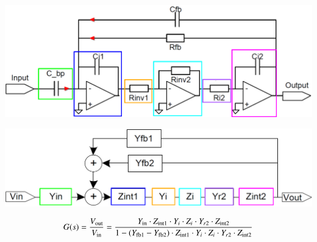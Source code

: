 \begin{minipage}[c]{0.48\columnwidth}
    \includegraphics[width=\columnwidth]{images/signalflussdiagramme_bandpass_schaltung.png}
\end{minipage}
\hfill
\begin{minipage}[c]{0.48\columnwidth}
    \includegraphics[width=\columnwidth]{images/signalflussdiagramme_bandpass_blockschaltbild.png}
\end{minipage}

$$ G(s) = \frac{V_{\rm out}}{V_{\rm in}} = \frac{Y_{\rm in} \cdot Z_{\rm int1} \cdot Y_i \cdot Z_i \cdot Y_{r2} \cdot Z_{\rm int2} }
    {1 - (Y_{\rm fb1} - Y_{\rm fb2}) \cdot Z_{\rm int1} \cdot Y_i \cdot Z_i \cdot Y_{r2} \cdot Z_{\rm int2} } $$

    